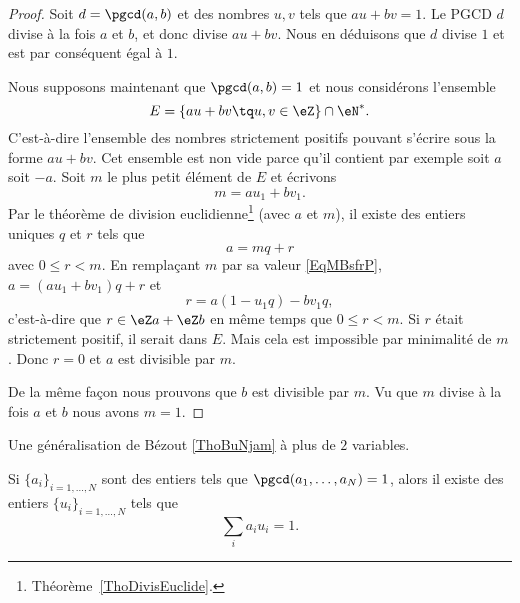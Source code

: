 \begin{proof}
    Soit \( d=\pgcd(a,b)\) et des nombres \( u,v\) tels que \( au+bv=1\). Le PGCD \( d\) divise à la fois \( a\) et \( b\), et donc divise \( au+bv\). Nous en déduisons que \( d\) divise \( 1\) et est par conséquent égal à \( 1\).

    Nous supposons maintenant que \( \pgcd(a,b)=1\) et nous considérons l'ensemble
    \begin{equation}
        E=\{ au+bv\tq u,v\in \eZ \}\cap \eN^*.
    \end{equation}
    C'est-à-dire l'ensemble des nombres strictement positifs pouvant s'écrire sous la forme \( au+bv\). Cet ensemble est non vide parce qu'il contient par exemple soit \( a\) soit \( -a\). Soit \( m\) le plus petit élément de \( E\) et écrivons
    \begin{equation}    \label{EqMBsfrP}
        m=au_1+bv_1.
    \end{equation}
    Par le théorème de division euclidienne\footnote{Théorème~\ref{ThoDivisEuclide}.} (avec \( a\) et \( m\)), il existe des entiers uniques $q$ et $r$ tels que
    \begin{equation}
        a=mq+r
    \end{equation}
    avec \( 0\leq r<m\). En remplaçant \( m\) par sa valeur \eqref{EqMBsfrP}, \( a=(au_1+bv_1)q+r\) et
    \begin{equation}
        r=a(1-u_1q)-bv_1q,
    \end{equation}
    c'est-à-dire que \( r\in \eZ a+\eZ b\) en même temps que \( 0\leq r<m\). Si \( r\) était strictement positif, il serait dans \( E\). Mais cela est impossible par minimalité de \( m\). Donc \( r=0\) et \( a\) est divisible par \( m\).

    De la même façon nous prouvons que \( b\) est divisible par \( m\). Vu que \( m\) divise à la fois \( a\) et \( b\) nous avons \( m=1\).
\end{proof}

Une généralisation de Bézout \ref{ThoBuNjam} à plus de \( 2\) variables.
\begin{proposition}     \label{PROPooWSMTooMdfqse}
    Si \( \{ a_i \}_{i=1,\ldots, N}\) sont des entiers tels que \( \pgcd(a_1,\ldots, a_N)=1\), alors il existe des entiers \( \{ u_i \}_{i=1,\ldots, N}\) tels que
    \begin{equation}
        \sum_ia_iu_i=1.
    \end{equation}
\end{proposition}

